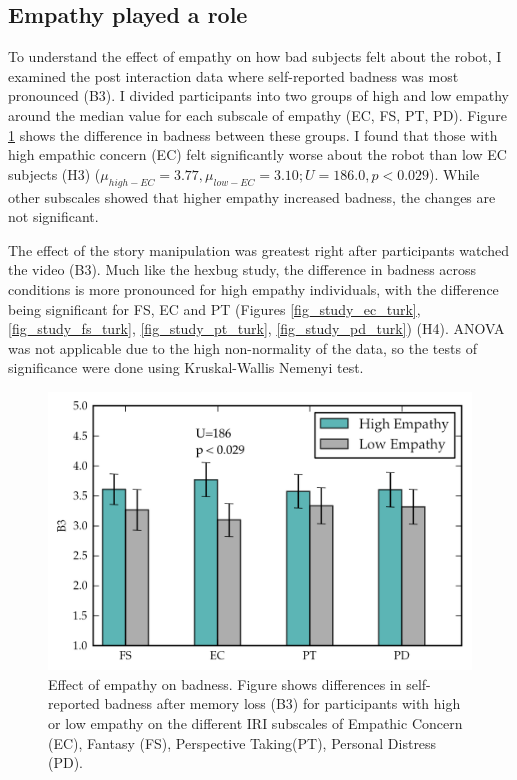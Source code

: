 

\subsection{Empathy played a role}

To understand the effect of empathy on how bad subjects felt about the robot, I examined the post interaction data where self-reported badness was most pronounced (B3). I divided participants into two groups of high and low empathy around the median value for each subscale of empathy (EC, FS, PT, PD).  Figure \ref{fig_study_all_postbad_u} shows the difference in badness between these groups. I found that those with high empathic concern (EC) felt significantly worse about the robot than low EC subjects (H3) ($\mu_{high-EC}=3.77, \mu_{low-EC}=3.10; U=186.0, p < 0.029$). While other subscales showed that higher empathy increased badness, the changes are not significant. 

The effect of the story manipulation was greatest right after participants watched the video (B3). Much like the hexbug study, the difference in badness across conditions is more pronounced for high empathy individuals, with the difference being significant for FS, EC and PT (Figures \ref{fig_study_ec_turk}, \ref{fig_study_fs_turk}, \ref{fig_study_pt_turk}, \ref{fig_study_pd_turk}) (H4). ANOVA was not applicable due to the high non-normality of the data, so the tests of significance were done using Kruskal-Wallis Nemenyi test. 

   \begin{figure}[thpb]
      \centering
      \includegraphics[width=4.6in]{figures/study/rev2/empathy/all_postbad_u.png}
      \caption{Effect of empathy on badness. Figure shows differences in self-reported badness after memory loss (B3) for participants with high or low empathy on the different IRI subscales of Empathic Concern (EC), Fantasy (FS), Perspective Taking(PT), Personal Distress (PD).  }
      \label{fig_study_all_postbad_u}
   \end{figure}



